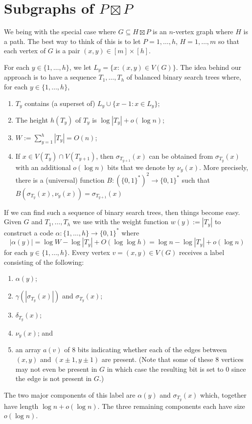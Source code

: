\documentclass[kpfonts]{patmorin}
\begin{document}
\section{Subgraphs of $P\boxtimes P$}

We being with the special case where $G\subseteq H\boxtimes P$ is an $n$-vertex graph where $H$ is a path.  The best way to think of this is to let $P=1,\ldots,h$, $H=1,\ldots,m$ so that each vertex of $G$ is a pair $(x,y)\in[m]\times [h]$.  

For each $y\in\{1,\ldots,h\}$, we let $L_y=\{x:(x,y)\in V(G)\}$.  The idea behind our approach is to have a sequence $T_1,\ldots,T_h$ of balanced binary search trees where, for each $y\in\{1,\ldots,h\}$,
\begin{enumerate}[(PR1)]
  \item $T_y$ contains (a superset of) $L_y\cup \{x-1:x\in L_y\}$;
  \item The height $h(T_y)$ of $T_y$ is $\log |T_y| + o(\log n)$;
  \item $W:=\sum_{y=1}^h |T_y| = O(n)$;
  \item If $x\in V(T_y)\cap V(T_{y+1})$, then $\sigma_{T_{y+1}}(x)$ can be obtained from $\sigma_{T_{y}}(x)$ with an additional $o(\log n)$ bits that we denote by $\nu_y(x)$.  More precisely, there is a (universal) function $B:(\{0,1\}^*)^2\to\{0,1\}^*$ such that $B(\sigma_{T_{y}}(x), \nu_y(x))=\sigma_{T_{y+1}}(x)$
\end{enumerate}
If we can find such a sequence of binary search trees, then things become easy.  Given $G$ and $T_{1},\ldots,T_h$ we use  with the weight function $w(y):=|T_y|$ to construct a code $\alpha:\{1,\ldots,h\}\to\{0,1\}^*$ where
\[  
  |\alpha(y)| = \log W-\log|T_y| + O(\log\log h) = \log n - \log|T_y| + o(\log n)
\]
for each $y\in\{1,\ldots,h\}$.  Every vertex $v=(x,y)\in V(G)$ receives a label consisting of the following:
\begin{enumerate}
  \item $\alpha(y)$;
  \item $\gamma(|\sigma_{T_y}(x)|)$ and $\sigma_{T_y}(x)$;    
  \item $\delta_{T_y}(x)$;
  \item $\nu_y(x)$; and
  \item an array $a(v)$ of $8$ bits indicating whether each of the edges between $(x,y)$ and $(x\pm 1,y\pm 1)$ are present.  (Note that some of these 8 vertices may not even be present in $G$ in which case the resulting bit is set to 0 since the edge is not present in $G$.)
\end{enumerate}
The two major components of this label are $\alpha(y)$ and $\sigma_{T_y}(x)$ which, together have length $\log n + o(\log n)$.  The three remaining components each have size $o(\log n)$.
\end{document}
